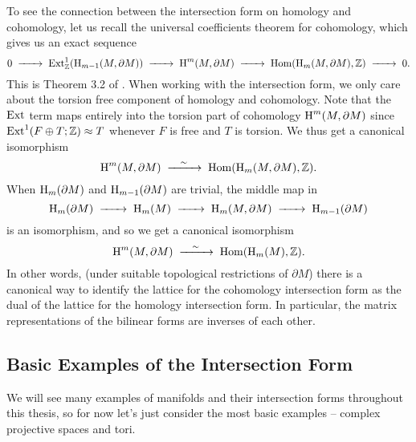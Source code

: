 \begin{remark} \label{rmk:dual-lattice-intersection-form}
	To see the connection between the intersection form on homology and cohomology, let us recall the universal coefficients theorem for cohomology, which gives us an exact sequence
	\[
		0 \lkxto \Ext^1_\Z(\H_{m-1}(M,\partial M)) \lkxto \H^m(M, \partial M) \lkxto \Hom(\H_m(M, \partial M), \Z) \lkxto 0.
	\]
	This is Theorem 3.2 of \cite{hatcher2002topology}. When working with the intersection form, we only care about the torsion free component of homology and cohomology. Note that the $\operatorname{Ext}$ term maps entirely into the torsion part of cohomology $\operatorname{H}^m(M,\partial M)$ since $\operatorname{Ext}^1(F\oplus T; \mathbb{Z})\approx T$ whenever $F$ is free and $T$ is torsion. We thus get a canonical isomorphism
	\[
		\H^m(M, \partial M) \lkxisom \Hom(\H_m(M,\partial M), \Z).
	\]
	When $\operatorname{H}_{m}(\partial M)$ and $\operatorname{H}_{m-1}(\partial M)$ are trivial, the middle map in
	\[
		\H_m(\partial M) \lkxto \H_m(M) \lkxto \H_m(M,\partial M) \lkxto \H_{m-1}(\partial M)
	\]
	is an isomorphism, and so we get a canonical isomorphism
	\[
		\H^m(M, \partial M) \lkxisom \Hom(\H_m(M), \Z).
	\]
	In other words, (under suitable topological restrictions of $\partial M$) there is a canonical way to identify the lattice for the cohomology intersection form as the dual of the lattice for the homology intersection form. In particular, the matrix representations of the bilinear forms are inverses of each other.
\end{remark}

\subsection{Basic Examples of the Intersection Form}

We will see many examples of manifolds and their intersection forms throughout this thesis, so for now let's just consider the most basic examples -- complex projective spaces and tori.

